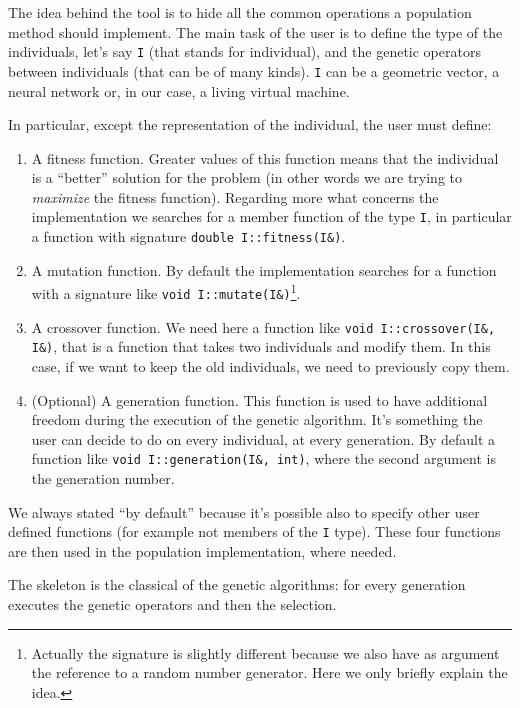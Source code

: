 \documentclass{report}
\begin{document}
The idea behind the tool is to hide all the common operations a population method should implement. The main task of the user is to define the type of the individuals, let's say \texttt{I} (that stands for individual), and the genetic operators between individuals (that can be of many kinds). \texttt{I} can be a geometric vector, a neural network or, in our case, a living virtual machine.

In particular, except the representation of the individual, the user must define:

\begin{enumerate}
\item A fitness function. Greater values of this function means that the individual is a ``better'' solution for the problem (in other words we are trying to \textit{maximize} the fitness function). Regarding more what concerns the implementation we searches for a member function of the type \texttt{I}, in particular a function with signature \texttt{double I::fitness(I\&)}.

\item A mutation function. By default the implementation searches for a function with a signature like \texttt{void I::mutate(I\&)}\footnote{Actually the signature is slightly different because we also have as argument the reference to a random number generator. Here we only briefly explain the idea.}.

\item A crossover function. We need here a function like \texttt{void I::crossover(I\&, I\&)}, that is a function that takes two individuals and modify them. In this case, if we want to keep the old individuals, we need to previously copy them.

\item (Optional) A generation function. This function is used to have additional freedom during the execution of the genetic algorithm. It's something the user can decide to do on every individual, at every generation. By default a function like \texttt{void I::generation(I\&, int)}, where the second argument is the generation number.
\end{enumerate}

We always stated ``by default'' because it's possible also to specify other user defined functions (for example not members of the \texttt{I} type). These four functions are then used in the population implementation, where needed.

The skeleton is the classical of the genetic algorithms: for every generation executes the genetic operators and then the selection.
\end{document}
